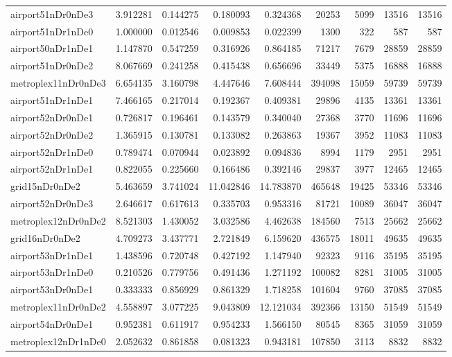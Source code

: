 \begin{longtable}{|l|r|r|r|r|r|r|r|r|}
airport51nDr0nDe3 & 3.912281 & 0.144275 & 0.180093 & 0.324368 & 20253 & 5099 & 13516 & 13516 \\
airport51nDr1nDe0 & 1.000000 & 0.012546 & 0.009853 & 0.022399 & 1300 & 322 & 587 & 587 \\
airport50nDr1nDe1 & 1.147870 & 0.547259 & 0.316926 & 0.864185 & 71217 & 7679 & 28859 & 28859 \\
airport51nDr0nDe2 & 8.067669 & 0.241258 & 0.415438 & 0.656696 & 33449 & 5375 & 16888 & 16888 \\
metroplex11nDr0nDe3 & 6.654135 & 3.160798 & 4.447646 & 7.608444 & 394098 & 15059 & 59739 & 59739 \\
airport51nDr1nDe1 & 7.466165 & 0.217014 & 0.192367 & 0.409381 & 29896 & 4135 & 13361 & 13361 \\
airport52nDr0nDe1 & 0.726817 & 0.196461 & 0.143579 & 0.340040 & 27368 & 3770 & 11696 & 11696 \\
airport52nDr0nDe2 & 1.365915 & 0.130781 & 0.133082 & 0.263863 & 19367 & 3952 & 11083 & 11083 \\
airport52nDr1nDe0 & 0.789474 & 0.070944 & 0.023892 & 0.094836 & 8994 & 1179 & 2951 & 2951 \\
airport52nDr1nDe1 & 0.822055 & 0.225660 & 0.166486 & 0.392146 & 29837 & 3977 & 12465 & 12465 \\
grid15nDr0nDe2 & 5.463659 & 3.741024 & 11.042846 & 14.783870 & 465648 & 19425 & 53346 & 53346 \\
airport52nDr0nDe3 & 2.646617 & 0.617613 & 0.335703 & 0.953316 & 81721 & 10089 & 36047 & 36047 \\
metroplex12nDr0nDe2 & 8.521303 & 1.430052 & 3.032586 & 4.462638 & 184560 & 7513 & 25662 & 25662 \\
grid16nDr0nDe2 & 4.709273 & 3.437771 & 2.721849 & 6.159620 & 436575 & 18011 & 49635 & 49635 \\
airport53nDr1nDe1 & 1.438596 & 0.720748 & 0.427192 & 1.147940 & 92323 & 9116 & 35195 & 35195 \\
airport53nDr1nDe0 & 0.210526 & 0.779756 & 0.491436 & 1.271192 & 100082 & 8281 & 31005 & 31005 \\
airport53nDr0nDe1 & 0.333333 & 0.856929 & 0.861329 & 1.718258 & 101604 & 9760 & 37085 & 37085 \\
metroplex11nDr0nDe2 & 4.558897 & 3.077225 & 9.043809 & 12.121034 & 392366 & 13150 & 51549 & 51549 \\
airport54nDr0nDe1 & 0.952381 & 0.611917 & 0.954233 & 1.566150 & 80545 & 8365 & 31059 & 31059 \\
metroplex12nDr1nDe0 & 2.052632 & 0.861858 & 0.081323 & 0.943181 & 107850 & 3113 & 8832 & 8832 \\

\end{longtable}
